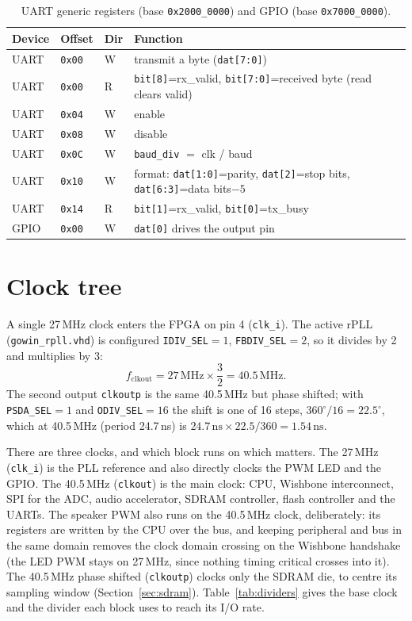 \documentclass[a4paper,11pt]{article}
\begin{document}
\begin{table}[H]
\centering
\caption{UART generic registers (base \texttt{0x2000\_0000}) and GPIO (base \texttt{0x7000\_0000}).}
\begin{tabular}{llll}
\toprule
\textbf{Device} & \textbf{Offset} & \textbf{Dir} & \textbf{Function} \\
\midrule
UART & \texttt{0x00} & W & transmit a byte (\texttt{dat[7:0]}) \\
UART & \texttt{0x00} & R & \texttt{bit[8]}=rx\_valid, \texttt{bit[7:0]}=received byte (read clears valid) \\
UART & \texttt{0x04} & W & enable \\
UART & \texttt{0x08} & W & disable \\
UART & \texttt{0x0C} & W & \texttt{baud\_div} $=$ clk / baud \\
UART & \texttt{0x10} & W & format: \texttt{dat[1:0]}=parity, \texttt{dat[2]}=stop bits, \texttt{dat[6:3]}=data bits$-5$ \\
UART & \texttt{0x14} & R & \texttt{bit[1]}=rx\_valid, \texttt{bit[0]}=tx\_busy \\
GPIO & \texttt{0x00} & W & \texttt{dat[0]} drives the output pin \\
\bottomrule
\end{tabular}
\end{table}

\section{Clock tree}
\label{sec:clocks}

A single 27\,MHz clock enters the FPGA on pin 4 (\texttt{clk\_i}). The active rPLL
(\texttt{gowin\_rpll.vhd}) is configured \texttt{IDIV\_SEL}$=1$, \texttt{FBDIV\_SEL}$=2$,
so it divides by 2 and multiplies by 3:
\[
f_\mathrm{clkout} = 27\,\mathrm{MHz}\times \frac{3}{2} = 40.5\,\mathrm{MHz}.
\]
The second output \texttt{clkoutp} is the same 40.5\,MHz but phase shifted; with
\texttt{PSDA\_SEL}$=1$ and \texttt{ODIV\_SEL}$=16$ the shift is one of 16 steps,
$360^{\circ}/16 = 22.5^{\circ}$, which at 40.5\,MHz (period 24.7\,ns) is
$24.7\,\mathrm{ns}\times 22.5/360 = 1.54\,\mathrm{ns}$.

There are three clocks, and which block runs on which matters. The 27\,MHz
(\texttt{clk\_i}) is the PLL reference and also directly clocks the PWM LED and
the GPIO. The 40.5\,MHz (\texttt{clkout}) is the main clock: CPU, Wishbone
interconnect, SPI for the ADC, audio accelerator, SDRAM controller, flash
controller and the UARTs. The speaker PWM also runs on the 40.5\,MHz clock,
deliberately: its registers are written by the CPU over the bus, and keeping
peripheral and bus in the same domain removes the clock domain crossing on the
Wishbone handshake (the LED PWM stays on 27\,MHz, since nothing timing critical
crosses into it). The 40.5\,MHz phase shifted (\texttt{clkoutp}) clocks only the
SDRAM die, to centre its sampling window (Section~\ref{sec:sdram}).
Table~\ref{tab:dividers} gives the base clock and the divider each block uses to
reach its I/O rate.
\end{document}
